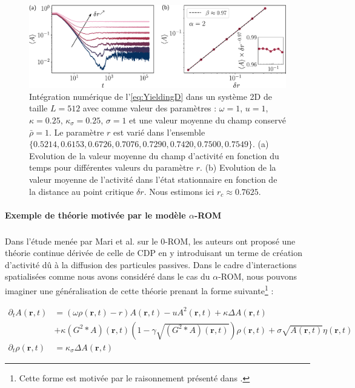 \begin{figure}[h]
	\centering
	\includegraphics[width=\textwidth]{Chapitre5/Figures/YieldingD.pdf}
	\caption{Intégration numérique de l'\autoref{eq:YieldingD} dans un système 2D de taille $L=512$ avec comme valeur des paramètres : $\omega = 1$, $u = 1$, $\kappa = 0.25$, $\kappa_\sigma = 0.25$, $\sigma = 1$ et une valeur moyenne du champ conservé $\bar{\rho} = 1$. Le paramètre $r$ est varié dans l'ensemble $\{ 0.5214,  0.6153, 0.6726, 0.7076, 0.7290, 0.7420, 0.7500, 0.7549\}$. (a) Evolution de la valeur moyenne du champ d'activité en fonction du temps pour différentes valeurs du paramètre $r$. (b) Evolution de la valeur moyenne de l'activité dans l'état stationnaire en fonction de la distance au point critique $\delta r$. Nous estimons ici $r_c \approx 0.7625$.}
	\label{fig:YieldingD}
\end{figure}

\paragraph{Exemple de théorie motivée par le modèle $\alpha$-ROM}

\subparagraph{}Dans l'étude menée par Mari et al. \cite{mari_absorbing_2022} sur le $0$-ROM, les auteurs ont proposé une théorie continue dérivée de celle de CDP en y introduisant un terme de création d'activité dû à la diffusion des particules passives. Dans le cadre d'interactions spatialisées comme nous avons considéré dans le cas du $\alpha$-ROM, nous pouvons imaginer une généralisation de cette théorie prenant la forme suivante\footnote{Cette forme est motivée par le raisonnement présenté dans \cite{mari_absorbing_2022}.} :

\begin{equation}
    \begin{aligned}
        \partial_t A (\mathbf{r}, t) &= \left(\omega \rho (\mathbf{r}, t)-r\right) A (\mathbf{r}, t) - uA^2 (\mathbf{r}, t) +\kappa \Delta A (\mathbf{r}, t)\\
        &+ \kappa \left(G^2\ast A \right)(\mathbf{r}, t)\left(1-\gamma \sqrt{ \left(G^2\ast A \right)(\mathbf{r}, t)}\right)\rho (\mathbf{r}, t)+ \sigma \sqrt{A (\mathbf{r}, t)}\eta (\mathbf{r}, t)\\
        \partial_t \rho (\mathbf{r}, t) &= \kappa_\sigma \Delta A (\mathbf{r}, t)
    \end{aligned}
\label{eq:SuspensionsB}
\end{equation}

